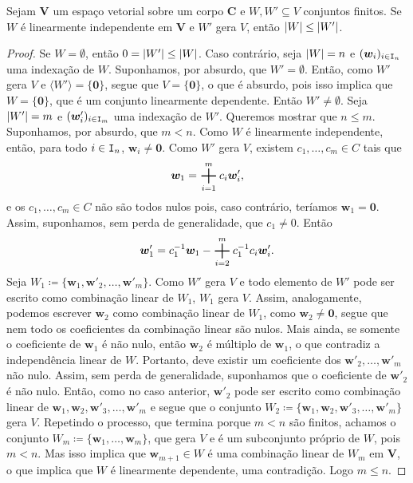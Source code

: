 \begin{prop}
	Sejam $\bm V$ um espaço vetorial sobre um corpo $\bm C$ e $W,W' \subseteq V$ conjuntos finitos. Se $W$ é linearmente independente em $\bm V$ e $W'$ gera $V$, então $\left\vert{W}\right\vert \leq \left\vert{W'}\right\vert$.
\end{prop}
\begin{proof}
	Se $W=\emptyset$, então $0 = \left\vert{W'}\right\vert \leq \left\vert{W}\right\vert$. Caso contrário, seja $\left\vert{W}\right\vert = n$ e $(\bm w_i)_{i \in \mathtt I_n}$ uma indexação de $W$. Suponhamos, por absurdo, que $W' = \emptyset$. Então, como $W'$ gera $V$ e $\langle W' \rangle = \{\bm 0\}$, segue que $V=\{\bm 0\}$, o que é absurdo, pois isso implica que $W=\{\bm 0\}$, que é um conjunto linearmente dependente. Então $W' \neq \emptyset$.  Seja $\left\vert{W'}\right\vert = m$ e $(\bm w'_i)_{i \in \mathtt I_m}$ uma indexação de $W'$. Queremos mostrar que $n \leq m$. Suponhamos, por absurdo, que $m < n$. Como $W$ é linearmente independente, então, para todo $i \in \mathtt I_n$, $\bm w_i \neq \bm 0$. Como $W'$ gera $V$, existem $c_1,\ldots,c_m \in C$ tais que
	\begin{equation*}
	\bm w_1 = \bigsum_{i=1}^m c_i \bm w'_i,
	\end{equation*}
e os $c_1,\ldots,c_m \in C$  não são todos nulos pois, caso contrário, teríamos $\bm w_1=\bm 0$. Assim, suponhamos,  sem perda de generalidade, que $c_1 \neq 0$. Então
	\begin{equation*}
	\bm w'_1 = c_1^{-1}\bm w_1 - \bigsum_{i=2}^m c_1^{-1}c_i \bm w'_i.
	\end{equation*}
Seja $W_1 \coloneqq \{\bm w_1,\bm w'_2,\ldots,\bm w'_m\}$. Como $W'$ gera $V$ e todo elemento de $W'$ pode ser escrito como combinação linear de $W_1$, $W_1$ gera $V$. Assim, analogamente, podemos escrever $\bm w_2$ como combinação linear de $W_1$, como $\bm w_2 \neq \bm 0$, segue que nem todo os coeficientes da combinação linear são nulos. Mais ainda, se somente o coeficiente de $\bm w_1$ é não nulo, então $\bm w_2$ é múltiplo de $\bm w_1$, o que contradiz a independência linear de $W$. Portanto, deve existir um coeficiente dos $\bm w'_2,\ldots,\bm w'_m$ não nulo. Assim, sem perda de generalidade, suponhamos que o coeficiente de $\bm w'_2$ é não nulo. Então, como no caso anterior, $\bm w'_2$ pode ser escrito como combinação linear de $\bm w_1, \bm w_2, \bm w'_3,\ldots, \bm w'_m$ e segue que o conjunto $W_2 \coloneqq \{\bm w_1, \bm w_2, \bm w'_3,\ldots, \bm w'_m\}$ gera $V$. Repetindo o processo, que termina porque $m<n$ são finitos, achamos o conjunto $W_m \coloneqq \{\bm w_1, \ldots, \bm w_m\}$, que gera $V$ e é um subconjunto próprio de $W$, pois $m < n$. Mas isso implica que $\bm w_{m+1} \in W$ é uma combinação linear de $W_m$ em $\bm V$, o que implica que $W$ é linearmente dependente, uma contradição. Logo $m \leq n$.
\end{proof}

